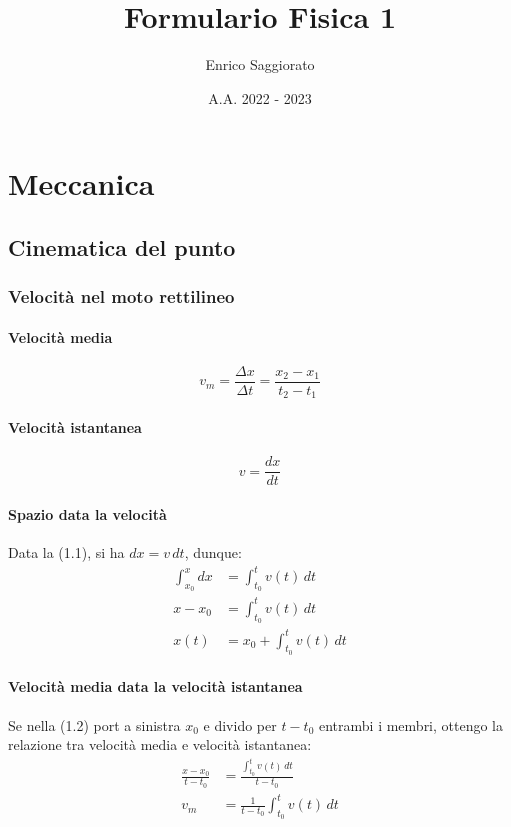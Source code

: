 \documentclass{report}
\title{Formulario Fisica 1}
\author{Enrico Saggiorato}
\date{A.A. 2022 - 2023}
\begin{document}
\setcounter{secnumdepth}{1}
\maketitle
\tableofcontents

\part{Meccanica}

\chapter{Cinematica del punto}

\setcounter{section}{2}
\section{Velocità nel moto rettilineo}
\subsection{Velocità media}
\begin{equation*}
    v_m = \frac{\Delta x}{\Delta t} = \frac{x_2 - x_1}{t_2 - t_1}
\end{equation*}
\subsection{Velocità istantanea}
\begin{equation}
    v = \frac{dx}{dt}
\end{equation} 
\subsection{Spazio data la velocità}
Data la (1.1), si ha \(dx = v\,dt\), dunque:
\begin{align}
    \int_{x_0}^{x}dx & = \int_{t_0}^{t}v(t)\,dt \nonumber \\
    x - x_0 & = \int_{t_0}^{t}v(t)\,dt \nonumber \\
    x(t) & = x_0 + \int_{t_0}^{t}v(t)\,dt
\end{align}
\subsection{Velocità media data la velocità istantanea}
Se nella (1.2) port a sinistra \(x_0\) e divido per \(t-t_0\) entrambi i membri,
ottengo la relazione tra velocità media e velocità istantanea:
\begin{align}
    \frac{x - x_0}{t - t_0} & = \frac{\int_{t_0}^{t}v(t)\,dt}{t - t_0} \nonumber \\
    v_m & = \frac{1}{t - t_0} \int_{t_0}^{t}v(t)\,dt
\end{align}
\end{document}
